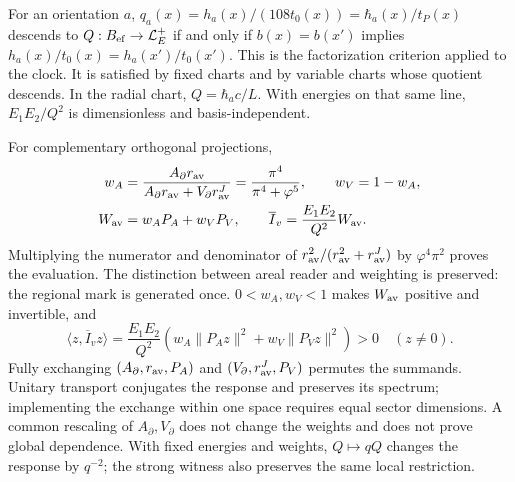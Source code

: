 For an orientation $a$, $q_a(x)=h_a(x)/(108t_0(x))=\hbar_a(x)/t_P(x)$ descends to $Q:B_{\rm ef}\to\mathcal L_E^+$ if and only if $b(x)=b(x')$ implies $h_a(x)/t_0(x)=h_a(x')/t_0(x')$. This is the factorization criterion applied to the clock. It is satisfied by fixed charts and by variable charts whose quotient descends. In the radial chart, $Q=\hbar_ac/L$. With energies on that same line, $E_1E_2/Q^2$ is dimensionless and basis-independent.

For complementary orthogonal projections,
\begin{align}
w_A&=\frac{A_\partial r_{\rm av}}
{A_\partial r_{\rm av}+V_\partial r_{\rm av}^J}
=\frac{\pi^4}{\pi^4+\varphi^5},\qquad w_V=1-w_A,
\label{hmtcuatro:gea:pesos}\\
W_{\rm av}&=w_AP_A+w_VP_V,\qquad
\overline I_v=\frac{E_1E_2}{Q^2}W_{\rm av}.
\label{hmtcuatro:gea:respuesta}
\end{align}
Multiplying the numerator and denominator of $r_{\rm av}^2/(r_{\rm av}^2+r_{\rm av}^J)$ by $\varphi^4\pi^2$ proves the evaluation. The distinction between areal reader and weighting is preserved: the regional mark is generated once. $0<w_A,w_V<1$ makes $W_{\rm av}$ positive and invertible, and
\[
\langle z,\overline I_vz\rangle
=\frac{E_1E_2}{Q^2}
(w_A\|P_Az\|^2+w_V\|P_Vz\|^2)>0\quad(z\ne0).
\]
Fully exchanging $(A_\partial,r_{\rm av},P_A)$ and $(V_\partial,r_{\rm av}^J,P_V)$ permutes the summands. Unitary transport conjugates the response and preserves its spectrum; implementing the exchange within one space requires equal sector dimensions. A common rescaling of $A_\partial,V_\partial$ does not change the weights and does not prove global dependence. With fixed energies and weights, $Q\mapsto qQ$ changes the response by $q^{-2}$; the strong witness also preserves the same local restriction.

